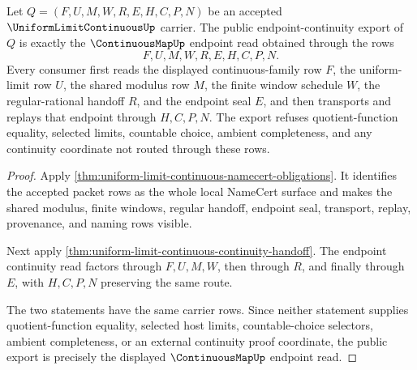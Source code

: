 \begin{theorem}
\label{thm:uniform-limit-continuous-public-export}
Let $Q=(F,U,M,W,R,E,H,C,P,N)$ be an accepted $\UniformLimitContinuousUp$ carrier. The public endpoint-continuity export of $Q$ is exactly the $\ContinuousMapUp$ endpoint read obtained through the rows
$$
F,U,M,W,R,E,H,C,P,N .
$$
Every consumer first reads the displayed continuous-family row $F$, the uniform-limit row $U$, the shared modulus row $M$, the finite window schedule $W$, the regular-rational handoff $R$, and the endpoint seal $E$, and then transports and replays that endpoint through $H,C,P,N$. The export refuses quotient-function equality, selected limits, countable choice, ambient completeness, and any continuity coordinate not routed through these rows.
\end{theorem}
\begin{proof}
Apply \autoref{thm:uniform-limit-continuous-namecert-obligations}. It identifies the accepted packet rows as the whole local NameCert surface and makes the shared modulus, finite windows, regular handoff, endpoint seal, transport, replay, provenance, and naming rows visible.

Next apply \autoref{thm:uniform-limit-continuous-continuity-handoff}. The endpoint continuity read factors through $F,U,M,W$, then through $R$, and finally through $E$, with $H,C,P,N$ preserving the same route.

The two statements have the same carrier rows. Since neither statement supplies quotient-function equality, selected host limits, countable-choice selectors, ambient completeness, or an external continuity proof coordinate, the public export is precisely the displayed $\ContinuousMapUp$ endpoint read.
\end{proof}

